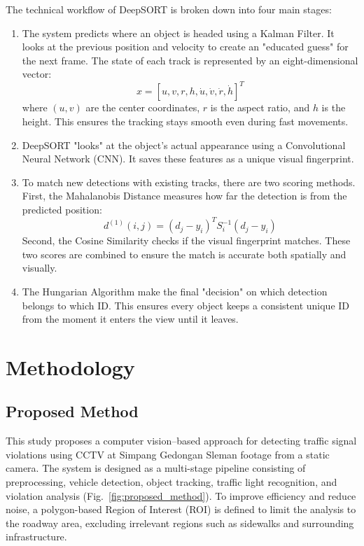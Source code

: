 \documentclass[conference]{IEEEtran}
\begin{document}
The technical workflow of DeepSORT is broken down into four main stages:

\begin{enumerate}
    \item The system predicts where an object is headed using a Kalman Filter. It looks at the previous position and velocity to create an "educated guess" for the next frame. The state of each track is represented by an eight-dimensional vector:
    \begin{equation}
        x = [u, v, r, h, \dot{u}, \dot{v}, \dot{r}, \dot{h}]^T
    \end{equation}
    where $(u, v)$ are the center coordinates, $r$ is the aspect ratio, and $h$ is the height. This ensures the tracking stays smooth even during fast movements.

    \item DeepSORT "looks" at the object's actual appearance using a Convolutional Neural Network (CNN). It saves these features as a unique visual fingerprint.

    \item To match new detections with existing tracks, there are two scoring methods. First, the {Mahalanobis Distance} measures how far the detection is from the predicted position:
    \begin{equation}
        d^{(1)}(i, j) = (d_j - y_i)^T S_i^{-1} (d_j - y_i)
    \end{equation}
    Second, the {Cosine Similarity} checks if the visual fingerprint matches. These two scores are combined to ensure the match is accurate both spatially and visually.

    \item The {Hungarian Algorithm} make the final "decision" on which detection belongs to which ID. This ensures every object keeps a consistent unique ID from the moment it enters the view until it leaves.
\end{enumerate}

\section{Methodology}
\subsection{Proposed Method} 
This study proposes a computer vision–based approach for detecting traffic signal violations using CCTV at Simpang Gedongan Sleman footage from a static camera. The system is designed as a multi-stage pipeline consisting of preprocessing, vehicle detection, object tracking, traffic light recognition, and violation analysis (Fig.~\ref{fig:proposed_method}). To improve efficiency and reduce noise, a polygon-based Region of Interest (ROI) is defined to limit the analysis to the roadway area, excluding irrelevant regions such as sidewalks and surrounding infrastructure.
\end{document}
